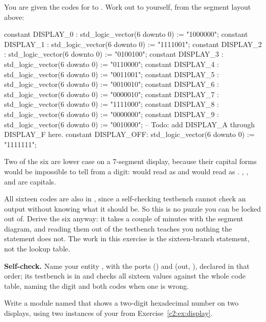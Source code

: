 You are given the codes for  to . Work out  to  yourself, from the
segment layout above:

\begin{vhdlcode}
constant DISPLAY_0  : std_logic_vector(6 downto 0) := "1000000";
constant DISPLAY_1  : std_logic_vector(6 downto 0) := "1111001";
constant DISPLAY_2  : std_logic_vector(6 downto 0) := "0100100";
constant DISPLAY_3  : std_logic_vector(6 downto 0) := "0110000";
constant DISPLAY_4  : std_logic_vector(6 downto 0) := "0011001";
constant DISPLAY_5  : std_logic_vector(6 downto 0) := "0010010";
constant DISPLAY_6  : std_logic_vector(6 downto 0) := "0000010";
constant DISPLAY_7  : std_logic_vector(6 downto 0) := "1111000";
constant DISPLAY_8  : std_logic_vector(6 downto 0) := "0000000";
constant DISPLAY_9  : std_logic_vector(6 downto 0) := "0010000";
-- Todo: add DISPLAY_A through DISPLAY_F here.
constant DISPLAY_OFF: std_logic_vector(6 downto 0) := "1111111";
\end{vhdlcode}

Two of the six are lower case on a 7-segment display, because their capital forms would be
impossible to tell from a digit:  would read as  and  would read as
. , ,  and  are capitals.

All sixteen codes are also in , since a self-checking testbench cannot check an
output without knowing what it should be. So this is no puzzle you can be locked out of. Derive the
six anyway: it takes a couple of minutes with the segment diagram, and reading them out of the
testbench teaches you nothing the  statement does not. The work in this exercise is the
sixteen-branch  statement, not the lookup table.


\begin{selfcheck}
\textbf{Self-check.} Name your entity , with the ports 
() and  (out, ),
declared in that order; its testbench is in  and checks all sixteen values
against the whole code table, naming the digit and both codes when one is wrong.
\end{selfcheck}

\label{c2:ex:hexdisplay}
Write a module named  that shows a two-digit hexadecimal number on two displays,
using two instances of your  from Exercise~\ref{c2:ex:display}.

